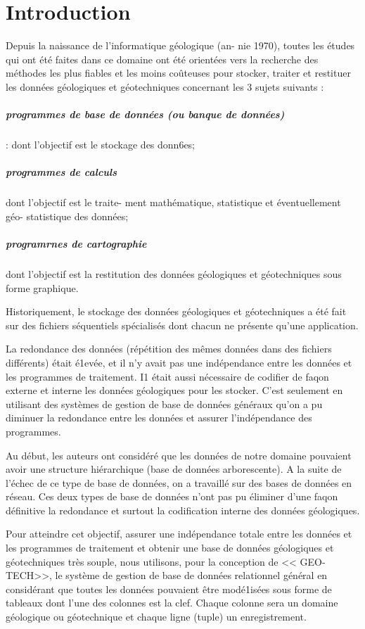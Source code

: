 \chapter*{Introduction}
Depuis la naissance de l'informatique géologique (an-
nie 1970), toutes les études qui ont été faites dans ce
domaine ont été orientées vers la recherche des
méthodes les plus fiables et les moins coûteuses pour
stocker, traiter et restituer les données géologiques et
géotechniques concernant les 3 sujets suivants :
\paragraph{programmes de base de données (ou banque de
données) }: dont l'objectif est le stockage des donn6es;

\paragraph{programmes de calculs}
 dont l'objectif est le traite-
ment mathématique, statistique et éventuellement géo-
statistique des données;

\paragraph{programrnes de cartographie}
 dont l'objectif est la
restitution des données géologiques et géotechniques
sous forme graphique.
\par
Historiquement, le stockage des données géologiques
et géotechniques a été fait sur des fichiers séquentiels
spécialisés dont chacun ne présente qu'une application.
\par
La redondance des données (répétition des mêmes
données dans des fichiers différents) était é1evée, et il
n'y avait pas une indépendance entre les données et les
programmes de traitement. I1 était aussi nécessaire de
codifier de faqon externe et interne les données géologiques pour les stocker. C'est seulement en utilisant
des systèmes de gestion de base de données généraux
qu'on a pu diminuer la redondance entre les données
et assurer l'indépendance des programmes.
\par
 Au début,
les auteurs ont considéré que les données de notre
domaine pouvaient avoir une structure hiérarchique
(base de données arborescente). A la suite de l'échec
de ce type de base de données, on a travaillé sur des
bases de données en réseau. Ces deux types de base de
données n'ont pas pu éliminer d'une faqon définitive
la redondance et surtout la codification interne des
données géologiques.
\cite{tunis}
\par
Pour atteindre cet objectif, assurer une indépendance
totale entre les données et les programmes de traitement et obtenir une base de données géologiques et
géotechniques très souple, nous utilisons, pour la
conception de << GEO-TECH>>, le système
de gestion de base de données relationnel général en
considérant que toutes les données pouvaient être
modé1isées sous forme de tableaux  dont
l'une des colonnes est la clef. Chaque colonne sera un
domaine géologique ou géotechnique et chaque ligne (tuple)
un enregistrement.